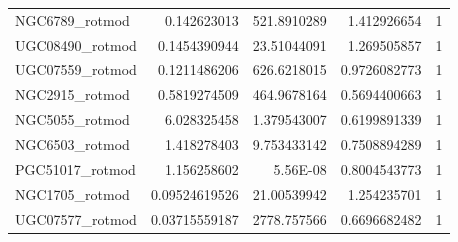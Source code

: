 \documentclass[reprint,%
 amsmath,amssymb,
 aps,
]{revtex4-1}
\begin{document}
\begin{table}[]
\begin{tabular}{|l|r|r|r|r|}
NGC6789\_rotmod        & 0.142623013                                             & 521.8910289                                       & 1.412926654                                             & 1                                                        \\
UGC08490\_rotmod       & 0.1454390944                                            & 23.51044091                                       & 1.269505857                                             & 1                                                        \\
UGC07559\_rotmod       & 0.1211486206                                            & 626.6218015                                       & 0.9726082773                                            & 1                                                        \\
NGC2915\_rotmod        & 0.5819274509                                            & 464.9678164                                       & 0.5694400663                                            & 1                                                        \\
NGC5055\_rotmod        & 6.028325458                                             & 1.379543007                                       & 0.6199891339                                            & 1                                                        \\
NGC6503\_rotmod        & 1.418278403                                             & 9.753433142                                       & 0.7508894289                                            & 1                                                        \\
PGC51017\_rotmod       & 1.156258602                                             & 5.56E-08                                          & 0.8004543773                                            & 1                                                        \\
NGC1705\_rotmod        & 0.09524619526                                           & 21.00539942                                       & 1.254235701                                             & 1                                                        \\
UGC07577\_rotmod       & 0.03715559187                                           & 2778.757566                                       & 0.6696682482                                            & 1                                                        \\

\end{tabular}
\end{table}
\end{document}
